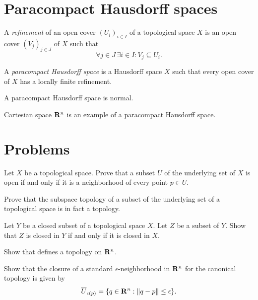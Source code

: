 \section{Paracompact Hausdorff spaces}
\label{sec:paracompactness}

A \emph{refinement} of an open cover $(U_i)_{i \in I}$ of a topological space $X$
is an open cover $(V_j)_{j \in J}$ of $X$ such that
\[
  \forall j \in J \, \exists i \in I: V_j \subseteq U_i.
\]

\begin{dfn}
  A \emph{paracompact Hausdorff space} is a Hausdorff space $X$ such that every
  open cover of $X$ has a locally finite refinement.
\end{dfn}

\begin{prop}
  \label{prop:paracompact_spaces}
  A paracompact Hausdorff space is normal.
\end{prop}

Cartesian space $\mathbf{R}^n$ is an example of a paracompact Hausdorff space.

\section{Problems}

\begin{xca}
  Let $X$ be a topological space. Prove that a subset $U$ of the underlying set
  of $X$ is open if and only if it is a neighborhood of every point $p \in U$.
\end{xca}

\begin{xca}
  Prove that the subspace topology of a subset of the underlying set of a topological
  space is in fact a topology.
\end{xca}

\begin{xca}
  Let $Y$ be a closed subset of a topological space $X$. Let $Z$ be a subset of
  $Y$. Show that $Z$ is closed in $Y$ if and only if it is closed in $X$.
\end{xca}

\begin{xca}
  Show that  defines a topology on $\mathbf{R}^n$.
\end{xca}

\begin{xca}
  Show that the closure of a standard $\epsilon$-neighborhood in $\mathbf{R}^n$
  for the canonical topology is given by
  \begin{equation}
    \overline U_{\epsilon(p)} = \lbrace q \in \mathbf{R}^n : \lVert q - p\rVert \leq \epsilon\rbrace.
  \end{equation}
\end{xca}

